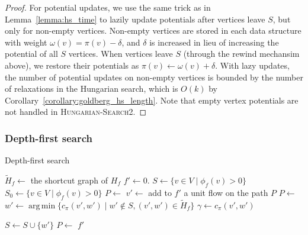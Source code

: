 \documentclass[11pt]{article}
\DeclareMathOperator*{\argmin}{arg\,min}
\def\fsupply{\phi}
\theoremstyle{plain}
\numberwithin{figure}{section}
\begin{document}
\begin{proof}
For potential updates, we use the same trick as in Lemma~\ref{lemma:hs_time} to
lazily update potentials after vertices leave $S$, but only for non-empty
vertices.
Non-empty vertices are stored in each data structure with weight
$\omega(v) = \pi(v) - \delta$, and $\delta$ is increased in lieu of increasing
the potential of all $S$ vertices.
When vertices leave $S$ (through the rewind mechansim above), we restore
their potentials as $\pi(v) \gets \omega(v) + \delta$.
With lazy updates, the number of potential updates on non-empty vertices is
bounded by the number of relaxations in the Hungarian search, which is $O(k)$
by Corollary~\ref{corollary:goldberg_hs_length}.
Note that empty vertex potentials are not handled in
\textsc{Hungarian-Search2}.
\end{proof}

\subsubsection{Depth-first search}

\begin{algorithm}
\caption{Depth-first search}
\label{algorithm:goldberg_dfs}
\begin{algorithmic}[1]
	\State $\tilde{H}_f \gets$ the shortcut graph of $H_f$
	\State $f' \gets 0$.
	\State $S \gets \{v \in V \mid \fsupply_f(v) > 0\}$
	\State $S_0 \gets \{v \in V \mid \fsupply_f(v) > 0\}$
	\State $P \gets$ 
	\Repeat
		\State $v' \gets$ 
		\If{$\fsupply_f(v') < 0$}
			\State add to $f'$ a unit flow on the path $P$
			\State $P \gets$ 
		\Else
			\State $w' \gets \argmin\{c_\pi(v', w') \mid w' \not\in S, (v', w') \in \tilde{H}_f\}$
			\State $\gamma \gets c_\pi(v', w')$

				\State $S \gets S \cup \{w'\}$
				\State $P \gets$ 
			\Else
				\State {}
			\EndIf
		\EndIf
	\State\Return $f'$
\EndFunction
\end{algorithmic}
\end{algorithm}
\end{document}
